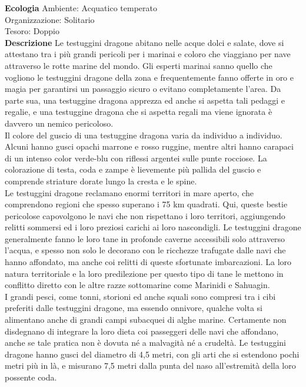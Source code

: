 \begin{multicols}{2}
\textbf{Ecologia}
Ambiente: Acquatico temperato\\
Organizzazione: Solitario\\
Tesoro: Doppio\\
\textbf{Descrizione}
Le testuggini dragone abitano nelle acque dolci e salate, dove si attestano tra i più grandi pericoli per i marinai e coloro che viaggiano per nave attraverso le rotte marine del mondo. Gli esperti marinai sanno quello che vogliono le testuggini dragone della zona e frequentemente fanno offerte in oro e magia per garantirsi un passaggio sicuro o evitano completamente l’area. Da parte sua, una testuggine dragona apprezza ed anche si aspetta tali pedaggi e regalie, e una testuggine dragona che si aspetta regali ma viene ignorata è davvero un nemico pericoloso.\\

Il colore del guscio di una testuggine dragona varia da individuo a individuo. Alcuni hanno gusci opachi marrone e rosso ruggine, mentre altri hanno carapaci di un intenso color verde-blu con riflessi argentei sulle punte rocciose. La colorazione di testa, coda e zampe è lievemente più pallida del guscio e comprende striature dorate lungo la cresta e le spine.\\
Le testuggini dragone reclamano enormi territori in mare aperto, che comprendono regioni che spesso superano i 75 km quadrati. Qui, queste bestie pericolose capovolgono le navi che non rispettano i loro territori, aggiungendo relitti sommersi ed i loro preziosi carichi ai loro nascondigli. Le testuggini dragone generalmente fanno le loro tane in profonde caverne accessibili solo attraverso l’acqua, e spesso non solo le decorano con le ricchezze trafugate dalle navi che hanno affondato, ma anche coi relitti di queste sfortunate imbarcazioni. La loro natura territoriale e la loro predilezione per questo tipo di tane le mettono in conflitto diretto con le altre razze sottomarine come Marinidi e Sahuagin.\\

I grandi pesci, come tonni, storioni ed anche squali sono compresi tra i cibi preferiti dalle testuggini dragone, ma essendo onnivore, qualche volta si alimentano anche di grandi campi subacquei di alghe marine. Certamente non disdegnano di integrare la loro dieta coi passeggeri delle navi che affondano, anche se tale pratica non è dovuta né a malvagità né a crudeltà. Le testuggini dragone hanno gusci del diametro di 4,5 metri, con gli arti che si estendono pochi metri più in là, e misurano 7,5 metri dalla punta del naso all’estremità della loro possente coda.\\


\end{multicols}
